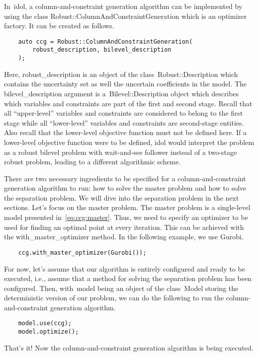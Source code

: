 In~\textsf{idol}, a column-and-constraint generation algorithm can be
implemented by using the class \textsf{Robust::ColumnAndConstraintGeneration}
which is an optimizer factory. It can be created as follows.

\begin{lstlisting}
    auto ccg = Robust::ColumnAndConstraintGeneration(
        robust_description, bilevel_description
    );
\end{lstlisting}
%
Here, \textsf{robust\_description} is an object of the
class~\textsf{Robust::Description} which contains the uncertainty set as well
the uncertain coefficients in the model. The \textsf{bilevel\_description}
argument is a~\textsf{Bilevel::Description} object which describes which
variables and constraints are part of the first and second stage. Recall that
all ``upper-level'' variables and constraints are considered to belong to the
first stage while all ``lower-level'' variables and constraints are
second-stage entities. Also recall that the lower-level objective function
must not be defined here. If a lower-level objective function were to be
defined, \textsf{idol} would interpret the problem as a robust bilevel problem
with wait-and-see follower instead of a two-stage robust problem, leading to a
different algorithmic scheme. 

There are two necessary ingredients to be specified for a
column-and-constraint generation algorithm to run: how to solve the master
problem and how to solve the separation problem. We will dive into the
separation problem in the next sections. Let's focus on the master problem.
The master problem is a single-level model presented in~\eqref{eq:ccg:master}.
Thus, we need to specify an optimizer to be used for finding an optimal point
at every iteration.  This can be achieved with the
\textsf{with\_master\_optimizer} method. In the following example, we use
\textsf{Gurobi}.
%
\begin{lstlisting}
    ccg.with_master_optimizer(Gurobi());
\end{lstlisting}
%
For now, let's assume that our algorithm is entirely configured and ready to
be executed, i.e., assume that a method for solving the separation problem has
been configured. Then, with~\textsf{model} being an object of the
class~\textsf{Model} storing the deterministic version of our problem, we can
do the following to run the column-and-constraint generation algorithm.
%
\begin{lstlisting}
    model.use(ccg);
    model.optimize();
\end{lstlisting}
That's it! Now the column-and-constraint generation algorithm is being
executed.

